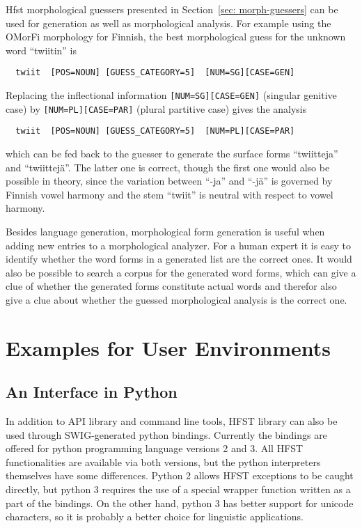\documentclass{llncs}
\begin{document}
Hfst morphological guessers presented in Section~\ref{sec:
  morph-guessers} can be used for generation as well as morphological
analysis. For example using the OMorFi morphology for Finnish, the
best morphological guess for the unknown word ``twiitin'' is
\begin{verbatim}
  twiit  [POS=NOUN] [GUESS_CATEGORY=5]  [NUM=SG][CASE=GEN]
\end{verbatim}
Replacing the inflectional information {\tt [NUM=SG][CASE=GEN]}
(singular genitive case) by {\tt [NUM=PL][CASE=PAR]} (plural
partitive case) gives the analysis
\begin{verbatim}
  twiit  [POS=NOUN] [GUESS_CATEGORY=5]  [NUM=PL][CASE=PAR]
\end{verbatim}
which can be fed back to the guesser to generate the surface forms
``twiitteja'' and ``twiittejä''. The latter one is correct, though the
first one would also be possible in theory, since the variation
between ``-ja'' and ``-jä'' is governed by Finnish vowel harmony and
the stem ``twiit'' is neutral with respect to vowel harmony.

Besides language generation, morphological form generation is useful
when adding new entries to a morphological analyzer. For a human
expert it is easy to identify whether the word forms in a generated
list are the correct ones. It would also be possible to search a
corpus for the generated word forms, which can give a clue of whether
the generated forms constitute actual words and therefor also give a
clue about whether the guessed morphological analysis is the correct
one.

\section{Examples for User Environments}

\subsection{An Interface in Python}

In addition to API library and command line tools, HFST library can also be used
through SWIG-generated python bindings. Currently the bindings are offered for
python programming language versions 2 and 3. All HFST functionalities are available
via both versions, but the python interpreters themselves have some differences.
Python 2 allows HFST exceptions to be caught directly, but python 3 requires the use
of a special wrapper function written as a part of the bindings. On the other hand, 
python 3 has better support for unicode characters, so it is probably a better choice
for linguistic applications.
\end{document}

